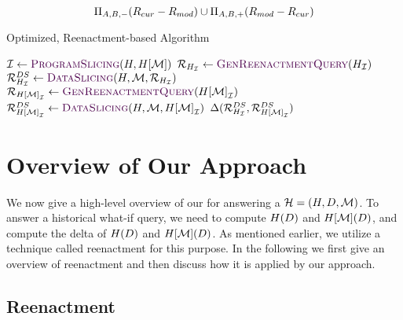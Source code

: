 \[
  \Pi_{A,B,-}(R_{cur} - R_{mod}) \cup   \Pi_{A,B,+}(R_{mod} - R_{cur})
\]


\begin{algorithm}[t]
  \caption{Optimized, Reenactment-based \abbrHW Algorithm}
  \label{alg:whatif-algo}
  \begin{algorithmic}[1]
    \State $\idxs \gets \Call{ProgramSlicing}{\history,\ahmod}$  \label{alg-line:opt-ps}
    \State $\ract{\hslice{\history}{\idxs}} \gets \Call{GenReenactmentQuery}{\hslice{\history}{\idxs}}$ \label{alg-line:opt-h-renact}
    \State $\ract{\hslice{\history}{\idxs}}^{DS} \gets \Call{DataSlicing}{\history,\deltaHist,\ract{\hslice{\history}{\idxs}}}$ \label{alg-line:opt-h-ds}
    \State $\ract{\hslice{\ahmod}{\idxs}} \gets \Call{GenReenactmentQuery}{\hslice{\ahmod}{\idxs}}$ \label{alg-line:opt-m-renact}
    \State $\ract{\hslice{\ahmod}{\idxs}}^{DS} \gets \Call{DataSlicing}{\history,\deltaHist,\hslice{\ahmod}{\idxs}}$ \label{alg-line:opt-m-ds}
    \State \Return $\Delta(\mathcal{R}_{{H}_{\mathcal{I}}}^{DS},\mathcal{R}_{{H[\mathcal{M}]}_{\mathcal{I}}}^{DS})$ \label{alg-line:opt-diff}
    \EndProcedure
  \end{algorithmic}
\end{algorithm}

\section{Overview of Our Approach}
\label{sec:overview}


We now give a high-level overview of our  for answering a \abbrHW $\mathcal{H} = (H, D, \mathcal{M})$. 
To answer a historical what-if query, we need to compute $H(D)$ and $H[\mathcal{M}](D)$, and compute the delta of $H(D)$ and $H[\mathcal{M}](D)$. As mentioned earlier, we utilize a technique called reenactment for this purpose. In the following we first give an overview of reenactment and then discuss how it is applied by our approach. 


\subsection{Reenactment}
\label{sec:reenactment}

